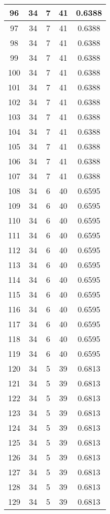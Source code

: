 \documentclass[letterpaper, 12pt]{article}
\begin{document}
\begin{longtable}{|c|c|c|c|c|}
\hline
96 & 34 & 7 & 41 & 0.6388 \\
\hline
97 & 34 & 7 & 41 & 0.6388 \\
\hline
98 & 34 & 7 & 41 & 0.6388 \\
\hline
99 & 34 & 7 & 41 & 0.6388 \\
\hline
100 & 34 & 7 & 41 & 0.6388 \\
\hline
101 & 34 & 7 & 41 & 0.6388 \\
\hline
102 & 34 & 7 & 41 & 0.6388 \\
\hline
103 & 34 & 7 & 41 & 0.6388 \\
\hline
104 & 34 & 7 & 41 & 0.6388 \\
\hline
105 & 34 & 7 & 41 & 0.6388 \\
\hline
106 & 34 & 7 & 41 & 0.6388 \\
\hline
107 & 34 & 7 & 41 & 0.6388 \\
\hline
108 & 34 & 6 & 40 & 0.6595 \\
\hline
109 & 34 & 6 & 40 & 0.6595 \\
\hline
110 & 34 & 6 & 40 & 0.6595 \\
\hline
111 & 34 & 6 & 40 & 0.6595 \\
\hline
112 & 34 & 6 & 40 & 0.6595 \\
\hline
113 & 34 & 6 & 40 & 0.6595 \\
\hline
114 & 34 & 6 & 40 & 0.6595 \\
\hline
115 & 34 & 6 & 40 & 0.6595 \\
\hline
116 & 34 & 6 & 40 & 0.6595 \\
\hline
117 & 34 & 6 & 40 & 0.6595 \\
\hline
118 & 34 & 6 & 40 & 0.6595 \\
\hline
119 & 34 & 6 & 40 & 0.6595 \\
\hline
120 & 34 & 5 & 39 & 0.6813 \\
\hline
121 & 34 & 5 & 39 & 0.6813 \\
\hline
122 & 34 & 5 & 39 & 0.6813 \\
\hline
123 & 34 & 5 & 39 & 0.6813 \\
\hline
124 & 34 & 5 & 39 & 0.6813 \\
\hline
125 & 34 & 5 & 39 & 0.6813 \\
\hline
126 & 34 & 5 & 39 & 0.6813 \\
\hline
127 & 34 & 5 & 39 & 0.6813 \\
\hline
128 & 34 & 5 & 39 & 0.6813 \\
\hline
129 & 34 & 5 & 39 & 0.6813 \\

\end{longtable}
\end{document}
